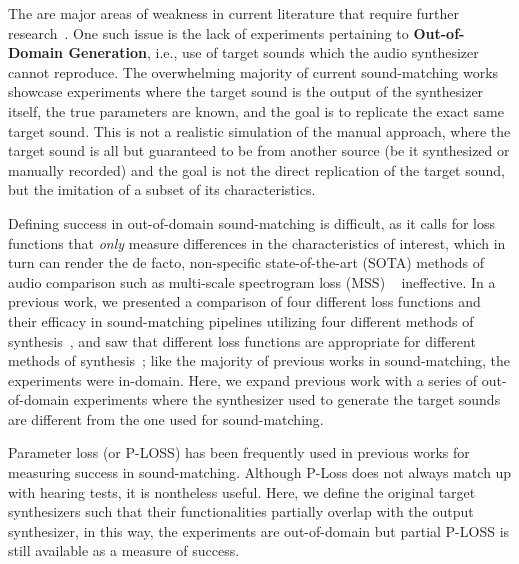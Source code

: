 \documentclass{article} %
\newcommand{\OutDomain}{\textbf{Out-of-Domain Generation}\xspace}
\begin{document}
The are major areas of weakness in current literature that require further research~\cite{salimi2025soundmatching}. One such issue is the lack of experiments pertaining to \OutDomain, i.e., use of target sounds which the audio synthesizer cannot reproduce. The overwhelming majority of current sound-matching works showcase experiments where the target sound is the output of the synthesizer itself, the true parameters are known, and the goal is to replicate the exact same target sound. This is not a realistic simulation of the manual approach, where the target sound is all but guaranteed to be from another source (be it synthesized or manually recorded) and the goal is not the direct replication of the target sound, but the imitation of a subset of its characteristics.

Defining success in out-of-domain sound-matching is difficult, as it calls for loss functions that \textit{only} measure differences in the characteristics of interest, which in turn can render the de facto, non-specific state-of-the-art (SOTA) methods of audio comparison such as multi-scale spectrogram loss (MSS) ~\cite{engel2020ddsp} ineffective. In a previous work, we presented a comparison of four different loss functions and their efficacy in sound-matching pipelines utilizing four different methods of synthesis~\cite{salimi2025soundmatching}, and saw that different loss functions are appropriate for different methods of synthesis~\cite{salimi2025soundmatching}; like the majority of previous works in sound-matching, the experiments were in-domain. Here, we expand previous work with a series of out-of-domain experiments where the synthesizer used to generate the target sounds are different from the one used for sound-matching. 

Parameter loss (or P-LOSS) has been frequently used in previous works for measuring success in sound-matching. Although P-Loss does not always match up with hearing tests, it is nontheless useful. Here, we define the original target synthesizers such that their functionalities partially overlap with the output synthesizer, in this way, the experiments are out-of-domain but partial P-LOSS is still available as a measure of success. 
\end{document}
